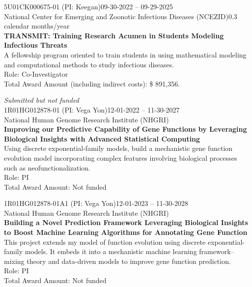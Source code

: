 \documentclass[letterpaper, 10pt]{article}
\renewcommand{\textbf}[1]{{\bfseries\color{teal}#1}}
\begin{document}
\noindent 5U01CK000675-01 (PI: Keegan)\hfill 09-30-2022 -- 09-29-2025\\
National Center for Emerging and Zoonotic Infectious Diseases (NCEZID)\hfill 0.3 calendar months/year\\
\textbf{TRANSMIT: Training Research Acumen in Students Modeling Infectious Threats}\\
A fellowship program oriented to train students in using mathematical modeling and computational methods to study infectious diseases.\\
Role: Co-Investigator\\
Total Award Amount (including indirect costs): \$ 891,356. \vspace{.5cm}

\noindent \textit{Submitted but not funded}\\

\noindent 1R01HG012878-01 (PI: Vega Yon)\hfill 12-01-2022 -- 11-30-2027\\
National Human Genome Research Institute (NHGRI)\\
\textbf{Improving our Predictive Capability of Gene Functions by Leveraging Biological Insights with Advanced Statistical Computing}\\
Using discrete exponential-family models, build a mechanistic gene function evolution model incorporating complex features involving biological processes such as neofunctionalization.\\
Role: PI\\
Total Award Amount: Not funded \vspace{.5cm}

\noindent 1R01HG012878-01A1	(PI: Vega Yon)\hfill 12-01-2023 -- 11-30-2028\\
National Human Genome Research Institute (NHGRI)\\
\textbf{Building a Novel Prediction Framework Leveraging Biological Insights to Boost Machine Learning Algorithms for Annotating Gene Function} \\
This project extends my model of function evolution using discrete exponential-family models. It embeds it into a mechanistic machine learning framework--mixing theory and data-driven models to improve gene function prediction.\\
Role: PI\\
Total Award Amount: Not funded \vspace{.5cm}



% 
% 
\end{document}
